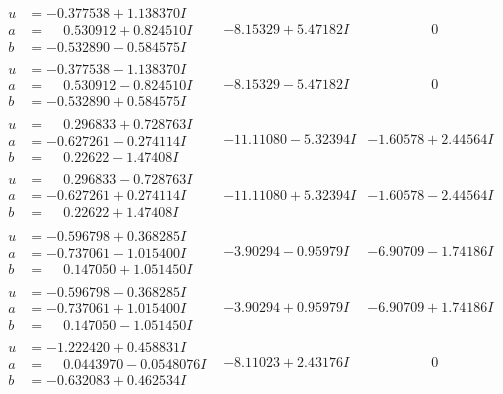 \documentclass[1p]{elsarticle_modified}
\theoremstyle{definition}
\begin{document}
$$\begin{array}{c|c|c}
\begin{aligned}
u &= -0.377538 + 1.138370 I \\
a &= \phantom{-}0.530912 + 0.824510 I \\
b &= -0.532890 - 0.584575 I\end{aligned}
 & -8.15329 + 5.47182 I & \phantom{-0.000000 } 0 \\ \hline\begin{aligned}
u &= -0.377538 - 1.138370 I \\
a &= \phantom{-}0.530912 - 0.824510 I \\
b &= -0.532890 + 0.584575 I\end{aligned}
 & -8.15329 - 5.47182 I & \phantom{-0.000000 } 0 \\ \hline\begin{aligned}
u &= \phantom{-}0.296833 + 0.728763 I \\
a &= -0.627261 - 0.274114 I \\
b &= \phantom{-}0.22622 - 1.47408 I\end{aligned}
 & -11.11080 - 5.32394 I & -1.60578 + 2.44564 I \\ \hline\begin{aligned}
u &= \phantom{-}0.296833 - 0.728763 I \\
a &= -0.627261 + 0.274114 I \\
b &= \phantom{-}0.22622 + 1.47408 I\end{aligned}
 & -11.11080 + 5.32394 I & -1.60578 - 2.44564 I \\ \hline\begin{aligned}
u &= -0.596798 + 0.368285 I \\
a &= -0.737061 - 1.015400 I \\
b &= \phantom{-}0.147050 + 1.051450 I\end{aligned}
 & -3.90294 - 0.95979 I & -6.90709 - 1.74186 I \\ \hline\begin{aligned}
u &= -0.596798 - 0.368285 I \\
a &= -0.737061 + 1.015400 I \\
b &= \phantom{-}0.147050 - 1.051450 I\end{aligned}
 & -3.90294 + 0.95979 I & -6.90709 + 1.74186 I \\ \hline\begin{aligned}
u &= -1.222420 + 0.458831 I \\
a &= \phantom{-}0.0443970 - 0.0548076 I \\
b &= -0.632083 + 0.462534 I\end{aligned}
 & -8.11023 + 2.43176 I & \phantom{-0.000000 } 0 \\ \hline\begin{aligned}

\end{aligned}
\end{array}$$
\end{document}
